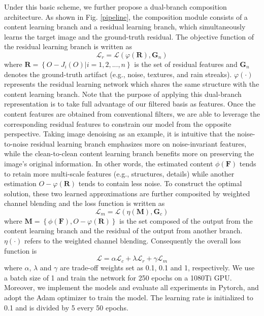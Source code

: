 \documentclass[twocolumn]{svjour3}          %
\begin{document}
Under this basic scheme, we further propose a dual-branch composition architecture. As shown in Fig. \ref{pipeline}, the composition module consists of a content learning branch and a residual learning branch, which simultaneously learns the target image and the ground-truth residual. The objective function of the residual learning branch is written as
\begin{equation}
	\mathcal{L}_{r}=\mathcal{L}\left(\varphi\left(\mathbf{R}\right), \mathbf{G}_{n}\right)
\end{equation}
where $\mathbf{R}=\left\{O-{J}_{i}(O)|i=1,2,...,n\right\}$ is the set of residual features and $\mathbf{G}_{n}$ denotes the ground-truth artifact (e.g., noise, textures, and rain streaks). $\varphi(\cdot)$ represents the residual learning network which shares the same structure with the content learning branch. Note that the purpose of applying this dual-branch representation is to take full advantage of our filtered basis as features. Once the content features are obtained from conventional filters, we are able to leverage the corresponding residual features to constrain our model from the opposite perspective. Taking image denoising as an example, it is intuitive that the noise-to-noise residual learning branch emphasizes more on noise-invariant features, while the clean-to-clean content learning branch benefits more on preserving the image's original information. In other words, the estimated content $\phi(\mathbf{F})$ tends to retain more multi-scale features (e.g., structures, details) while another estimation $O-\varphi(\mathbf{R})$ tends to contain less noise. To construct the optimal solution, these two learned approximations are further composited by weighted channel blending and the loss function is written as
\begin{equation}
	\mathcal{L}_{m}=\mathcal{L}\left(\eta\left(\mathbf{M}\right), \mathbf{G}_{c}\right)
\end{equation}
where $\mathbf{M}=\left\{\phi(\mathbf{F}),O-\varphi(\mathbf{R})\right\}$ is the set composed of the output from the content learning branch and the residual of the output from another branch. $\eta(\cdot)$ refers to the weighted channel blending. Consequently the overall loss function is
\begin{equation} \label{loss_t}
	\mathcal{L}=\alpha \mathcal{L}_{c}+\lambda \mathcal{L}_{r}+\gamma \mathcal{L}_{m}
\end{equation}
where $\alpha$, $\lambda$ and $\gamma$ are trade-off weights set as 0.1, 0.1 and 1, respectively. We use a batch size of 1 and train the network for 250 epochs on a 1080Ti GPU. Moreover, we implement the models and evaluate all experiments in Pytorch, and adopt the Adam optimizer to train the model. The learning rate is initialized to 0.1 and is divided by 5 every 50 epochs.
\end{document}
